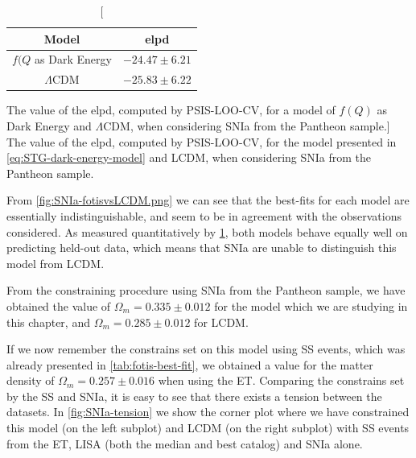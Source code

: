 \begin{table}[h!]
    \centering
    \begin{tabular}{|c|c|}
        \hline
        Model                & elpd              \\ \hline
        $f(Q$ as Dark Energy & $-24.47 \pm 6.21$ \\ \hline
        $\Lambda$CDM         & $-25.83 \pm 6.22$ \\ \hline
    \end{tabular}
    \caption
    [The value of the elpd, computed by PSIS-LOO-CV, for a model of $f(Q)$ as Dark Energy and $\Lambda$CDM, when considering SNIa from the Pantheon sample.]
    {The value of the \gls{elpd}, computed by \gls{PSIS-LOO-CV}, for the model presented in \cref{eq:STG-dark-energy-model} and \gls{LCDM}, when considering \gls{SNIa} from the Pantheon sample.}
    \label{tab:elpd-SNIa}
\end{table}

From \cref{fig:SNIa-fotisvsLCDM.png} we can see that the best-fits for each model are essentially indistinguishable, and seem to be in agreement with the observations considered. As measured quantitatively by \cref{tab:elpd-SNIa}, both models behave equally well on predicting held-out data, which means that \gls{SNIa} are unable to distinguish this model from \gls{LCDM}.

From the constraining procedure using \gls{SNIa} from the Pantheon sample, we have obtained the value of $\Omega_m = 0.335 \pm 0.012$ for the model which we are studying in this chapter, and $\Omega_m = 0.285 \pm 0.012$ for \gls{LCDM}.

If we now remember the constrains set on this model using \gls{SS} events, which was already presented in \cref{tab:fotis-best-fit}, we obtained a value for the matter density of $\Omega_m = 0.257 \pm 0.016$ when using the \gls{ET}. Comparing the constrains set by the \gls{SS} and \gls{SNIa}, it is easy to see that there exists a tension between the datasets. In \cref{fig:SNIa-tension} we show the corner plot where we have constrained this model (on the left subplot) and \gls{LCDM} (on the right subplot) with \gls{SS} events from the \gls{ET}, \gls{LISA} (both the median and best catalog) and \gls{SNIa} alone.


